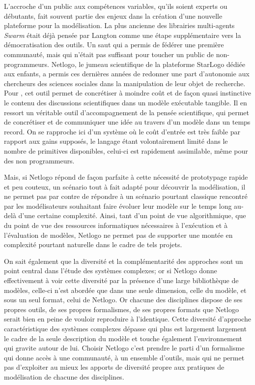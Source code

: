 L'accroche d'un public aux compétences variables, qu'ils soient experts ou débutants, fait souvent partie des enjeux dans la création d'une nouvelle plateforme pour la modélisation. La plus ancienne des librairies multi-agents \textit{Swarm} était déjà pensée par Langton comme une étape supplémentaire vers la démocratisation des outils. Un saut qui a permis de fédérer une première communauté, mais qui n'était pas suffisant pour toucher un public de non-programmeurs. Netlogo, le jumeau scientifique de la plateforme StarLogo dédiée aux enfants, a permis ces dernières années de redonner une part d'autonomie aux chercheurs des sciences sociales dans la manipulation de leur objet de recherche. Pour \textcite{Banos2013}, cet outil permet de concrétiser à moindre coût et de façon quasi instinctive le contenu des discussions scientifiques dans un modèle exécutable tangible. Il en ressort un véritable outil d'accompagnement de la pensée scientifique, qui permet de concrétiser et de communiquer une idée au travers d'un modèle dans un temps record. On se rapproche ici d'un système où le coût d'entrée est très faible par rapport aux gains supposés, le langage étant volontairement limité dans le nombre de primitives disponibles, celui-ci est rapidement assimilable, même pour des non programmeurs. 

Mais, si Netlogo répond de façon parfaite à cette nécessité de prototypage rapide et peu couteux, un scénario tout à fait adapté pour découvrir la modélisation, il ne permet pas par contre de répondre à un scénario pourtant classique rencontré par les modélisateurs souhaitant faire évoluer leur modèle sur le temps long au-delà d'une certaine complexité. Ainsi, tant d'un point de vue algorithmique, que du point de vue des ressources informatiques nécessaires à l'exécution et à l'évaluation de modèles, Netlogo ne permet pas de supporter une montée en complexité pourtant naturelle dans le cadre de tels projets. 

On sait également que la diversité et la complémentarité des approches sont un point central dans l'étude des systèmes complexes; or si Netlogo donne effectivement à voir cette diversité par la présence d'une large bibliothèque de modèles, celle-ci n'est abordée que dans une seule dimension, celle du modèle, et sous un seul format, celui de Netlogo. Or chacune des disciplines dispose de ses propres outils, de ses propres formalismes, de ses propres formats que Netlogo serait bien en peine de vouloir reproduire à l'identique. Cette diversité d'approche caractéristique des systèmes complexes dépasse qui plus est largement largement le cadre de la seule description du modèle et touche également l'environnement qui gravite autour de lui. Choisir Netlogo c'est prendre le parti d'un formalisme qui donne accès à une communauté, à un ensemble d'outils, mais qui ne permet pas d'exploiter au mieux les apports de diversité propre aux pratiques de modélisation de chacune des disciplines. 

